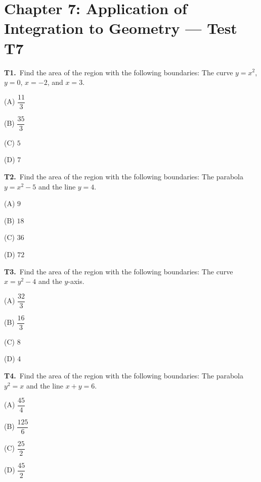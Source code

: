 \documentclass[11pt]{article}
\begin{document}
\section*{Chapter 7: Application of Integration to Geometry --- Test T7}

\bigskip\noindent\textbf{T1.}\ Find the area of the region with the following boundaries: The curve $y=x^2$, $y=0$, $x=-2$, and $x=3$.
\begin{list}{}{\setlength{\leftmargin}{3em}\setlength{\labelwidth}{2.5em}\setlength{\itemsep}{0pt}\setlength{\topsep}{2pt}}
\item[(A)] $\dfrac{11}{3}$
\item[(B)] $\dfrac{35}{3}$
\item[(C)] $5$
\item[(D)] $7$
\end{list}

\bigskip\noindent\textbf{T2.}\ Find the area of the region with the following boundaries: The parabola $y=x^2-5$ and the line $y=4$.
\begin{list}{}{\setlength{\leftmargin}{3em}\setlength{\labelwidth}{2.5em}\setlength{\itemsep}{0pt}\setlength{\topsep}{2pt}}
\item[(A)] $9$
\item[(B)] $18$
\item[(C)] $36$
\item[(D)] $72$
\end{list}

\bigskip\noindent\textbf{T3.}\ Find the area of the region with the following boundaries: The curve $x=y^2-4$ and the $y$-axis.
\begin{list}{}{\setlength{\leftmargin}{3em}\setlength{\labelwidth}{2.5em}\setlength{\itemsep}{0pt}\setlength{\topsep}{2pt}}
\item[(A)] $\dfrac{32}{3}$
\item[(B)] $\dfrac{16}{3}$
\item[(C)] $8$
\item[(D)] $4$
\end{list}

\bigskip\noindent\textbf{T4.}\ Find the area of the region with the following boundaries: The parabola $y^2=x$ and the line $x+y=6$.
\begin{list}{}{\setlength{\leftmargin}{3em}\setlength{\labelwidth}{2.5em}\setlength{\itemsep}{0pt}\setlength{\topsep}{2pt}}
\item[(A)] $\dfrac{45}{4}$
\item[(B)] $\dfrac{125}{6}$
\item[(C)] $\dfrac{25}{2}$
\item[(D)] $\dfrac{45}{2}$
\end{list}
\end{document}
